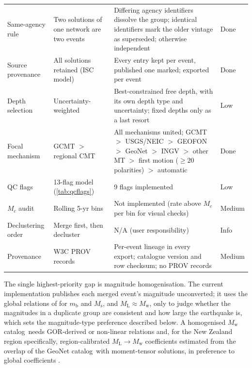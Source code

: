\documentclass[12pt]{article}
\newcommand{\catalog}{catalog}
\begin{document}
\begin{longtable}{p{2.8cm}p{3.3cm}p{3.5cm}p{1.5cm}}
  Same-agency rule & Two solutions of one network are two events \citep{Patton2016} & Differing agency identifiers dissolve the group; identical identifiers mark the older vintage as superseded; otherwise independent & Done \\
  Source provenance & All solutions retained (ISC model) & Every entry kept per event, published one marked; exported per event & Done \\
  Depth selection & Uncertainty-weighted \citep{Engdahl2020} & Best-constrained free depth, with its own depth type and uncertainty; fixed depths only as a last resort & Low \\
  Focal mechanism & GCMT $>$ regional CMT & All mechanisms united; GCMT $>$ USGS/NEIC $>$ GEOFON $>$ GeoNet $>$ INGV $>$ other MT $>$ first motion ($\geq 20$ polarities) $>$ automatic & Done \\
  QC flags & 13-flag model (\cref{tab:qcflags}) & 9 flags implemented & Low \\
  $M_c$ audit & Rolling 5-yr bins \citep{Wiemer2000} & Not implemented (rate above $M_c$ per bin for visual checks) & Medium \\
  Declustering order & Merge first, then decluster & N/A (user responsibility) & Info \\
  Provenance & W3C PROV records \citep{PROVO} & Per-event lineage in every export; catalogue version and row checksum; no PROV records & Medium \\
\end{longtable}

The single highest-priority gap is magnitude homogenisation.  The current
implementation publishes each merged event's magnitude unconverted; it uses the
global relations of \citet{Scordilis2006} for $m_\mathrm{b}$ and $M_\mathrm{s}$,
and $M_\mathrm{L} \approx M_\mathrm{w}$, only to judge whether the magnitudes in
a duplicate group are consistent and how large the earthquake is, which sets the
magnitude-type preference described below.  A homogenised $M_\mathrm{w}$ \catalog\ needs
GOR-derived \citep{Grunthal2016} or non-linear relations and, for the New Zealand
region specifically, region-calibrated $M_\mathrm{L} \to M_\mathrm{w}$
coefficients estimated from the overlap of the GeoNet \catalog\ with moment-tensor
solutions, in preference to global coefficients
\citep{GeoNetLocationInfo, NSHM2022BSSA}.
\end{document}
